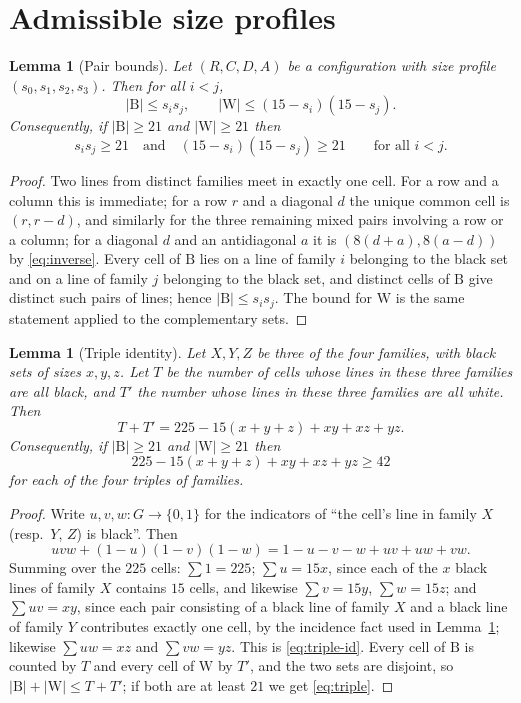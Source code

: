\documentclass[11pt]{amsart}
\newtheorem{lemma}[theorem]{Lemma}
\theoremstyle{remark}
\newcommand{\Bl}{\mathrm{B}}
\newcommand{\Wh}{\mathrm{W}}
\begin{document}
\section{Admissible size profiles}\label{sec:profiles}

\begin{lemma}[Pair bounds]\label{lem:pairs}
Let $(R,C,D,A)$ be a configuration with size profile $(s_0,s_1,s_2,s_3)$. Then for all $i<j$,
\[
|\Bl|\le s_is_j,\qquad |\Wh|\le (15-s_i)(15-s_j).
\]
Consequently, if $|\Bl|\ge 21$ and $|\Wh|\ge 21$ then
\begin{equation}\label{eq:pair}
s_is_j\ge 21\quad\text{and}\quad (15-s_i)(15-s_j)\ge 21\qquad\text{for all }i<j .
\end{equation}
\end{lemma}

\begin{proof}
Two lines from distinct families meet in exactly one cell. For a row and a column this is immediate; for a row $r$ and a diagonal $d$ the unique common cell is $(r,r-d)$, and similarly for the three remaining mixed pairs involving a row or a column; for a diagonal $d$ and an antidiagonal $a$ it is $(8(d+a),8(a-d))$ by \eqref{eq:inverse}. Every cell of $\Bl$ lies on a line of family $i$ belonging to the black set and on a line of family $j$ belonging to the black set, and distinct cells of $\Bl$ give distinct such pairs of lines; hence $|\Bl|\le s_is_j$. The bound for $\Wh$ is the same statement applied to the complementary sets.
\end{proof}

\begin{lemma}[Triple identity]\label{lem:triples}
Let $X,Y,Z$ be three of the four families, with black sets of sizes $x,y,z$. Let $T$ be the number of cells whose lines in these three families are all black, and $T'$ the number whose lines in these three families are all white. Then
\begin{equation}\label{eq:triple-id}
T+T'=225-15(x+y+z)+xy+xz+yz .
\end{equation}
Consequently, if $|\Bl|\ge 21$ and $|\Wh|\ge 21$ then
\begin{equation}\label{eq:triple}
225-15(x+y+z)+xy+xz+yz\ge 42
\end{equation}
for each of the four triples of families.
\end{lemma}

\begin{proof}
Write $u,v,w\colon G\to\{0,1\}$ for the indicators of ``the cell's line in family $X$ (resp.\ $Y$, $Z$) is black''. Then
\[
uvw+(1-u)(1-v)(1-w)=1-u-v-w+uv+uw+vw .
\]
Summing over the $225$ cells: $\sum 1=225$; $\sum u=15x$, since each of the $x$ black lines of family $X$ contains $15$ cells, and likewise $\sum v=15y$, $\sum w=15z$; and $\sum uv=xy$, since each pair consisting of a black line of family $X$ and a black line of family $Y$ contributes exactly one cell, by the incidence fact used in Lemma~\ref{lem:pairs}; likewise $\sum uw=xz$ and $\sum vw=yz$. This is \eqref{eq:triple-id}. Every cell of $\Bl$ is counted by $T$ and every cell of $\Wh$ by $T'$, and the two sets are disjoint, so $|\Bl|+|\Wh|\le T+T'$; if both are at least $21$ we get \eqref{eq:triple}.
\end{proof}
\end{document}
